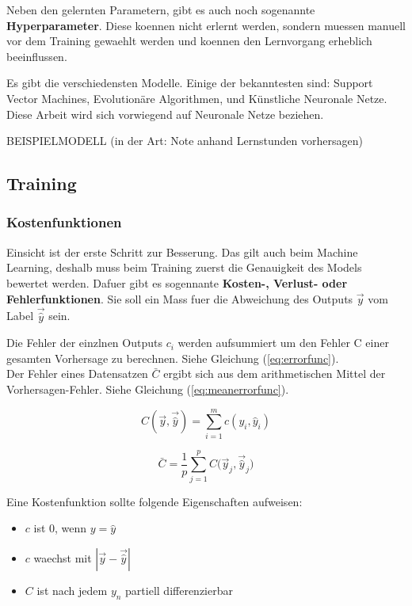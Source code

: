\documentclass[../main]{subfiles}
\begin{document}
Neben den gelernten Parametern, gibt es auch noch sogenannte \textbf{Hyperparameter}.
Diese koennen nicht erlernt werden, sondern muessen manuell vor dem Training gewaehlt werden und koennen den Lernvorgang erheblich beeinflussen.
\par
\medskip
Es gibt die verschiedensten Modelle. Einige der bekanntesten sind: Support Vector Machines, Evolutionäre Algorithmen, und Künstliche Neuronale Netze.
Diese Arbeit wird sich vorwiegend auf Neuronale Netze beziehen.

BEISPIELMODELL (in der Art: Note anhand Lernstunden vorhersagen)

\subsection{Training}
\subsubsection{Kostenfunktionen}
Einsicht ist der erste Schritt zur Besserung. Das gilt auch beim Machine Learning, deshalb muss beim Training zuerst die Genauigkeit des Models bewertet werden.
Dafuer gibt es sogennante \textbf{Kosten-, Verlust- oder Fehlerfunktionen}. Sie soll ein Mass fuer die Abweichung des Outputs $\vec{y}$ vom Label $\vec{\hat{y}}$ sein.
\par\medskip
Die Fehler der einzlnen Outputs $c_i$ werden aufsummiert um den Fehler C einer gesamten Vorhersage zu berechnen. Siehe Gleichung (\ref{eq:errorfunc}).\\
Der Fehler eines Datensatzen $\bar{C}$ ergibt sich aus dem arithmetischen Mittel der Vorhersagen-Fehler. Siehe Gleichung (\ref{eq:meanerrorfunc}).\\
%
\begin{minipage}[t]{0.5\textwidth}
    \centering
    \begin{equation}\label{eq:errorfunc}
        C(\vec{y},\vec{\hat{y}})=\displaystyle\sum_{i=1}^{m} c(y_i, \hat{y}_i)
    \end{equation}
\end{minipage}
\begin{minipage}[t]{0.5\textwidth}
    \centering
    \begin{equation}\label{eq:meanerrorfunc}
        \bar{C} = \frac{1}{p}\displaystyle\sum_{j=1}^{p} C\Big(\vec{y}_j,\vec{\hat{y}}_j\Big)
    \end{equation}
\end{minipage}

%
Eine Kostenfunktion sollte folgende Eigenschaften aufweisen:
\begin{itemize}
    \item{$c$ ist $0$, wenn $y = \hat{y}$}
    \item{$c$ waechst mit $|\vec{y}-\vec{\hat{y}}|$}
    \item{$C$ ist nach jedem $y_n$ partiell differenzierbar}
\end{itemize}
\end{document}

